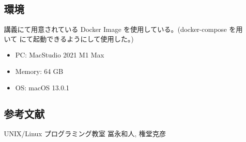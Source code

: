 \documentclass[platex,dvipdfmx, titlepage]{jlreq} %
\begin{document}
\subsection{環境}

講義にて用意されている Docker Image を使用している。(docker-compose を用いて にて起動できるようにして使用した。)

\begin{itemize}
    \item PC: MacStudio 2021 M1 Max
    \item Memory: 64 GB
    \item OS: macOS 13.0.1
\end{itemize}

\subsection{参考文献}

UNIX/Linux プログラミング教室 冨永和人, 権堂克彦
\end{document}
